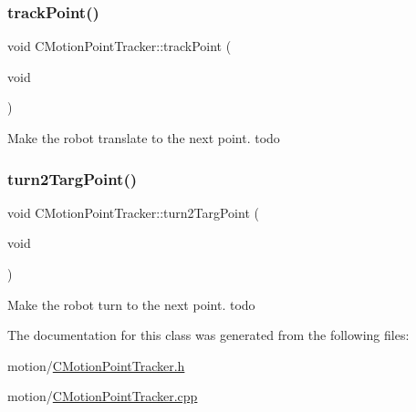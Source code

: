 \subsubsection{\texorpdfstring{track\+Point()}{trackPoint()}}
{\footnotesize\ttfamily void C\+Motion\+Point\+Tracker\+::track\+Point (\begin{DoxyParamCaption}\item[{void}]{ }\end{DoxyParamCaption})}

Make the robot translate to the next point. todo \mbox{\label{classmotion_1_1CMotionPointTracker_a587b38d9065c24f76005adde9a21fb75}} 
\subsubsection{\texorpdfstring{turn2\+Targ\+Point()}{turn2TargPoint()}}
{\footnotesize\ttfamily void C\+Motion\+Point\+Tracker\+::turn2\+Targ\+Point (\begin{DoxyParamCaption}\item[{void}]{ }\end{DoxyParamCaption})}

Make the robot turn to the next point. todo 

The documentation for this class was generated from the following files\+:\begin{DoxyCompactItemize}
\item 
motion/\mbox{\hyperlink{CMotionPointTracker_8h}{C\+Motion\+Point\+Tracker.\+h}}\item 
motion/\mbox{\hyperlink{CMotionPointTracker_8cpp}{C\+Motion\+Point\+Tracker.\+cpp}}\end{DoxyCompactItemize}
